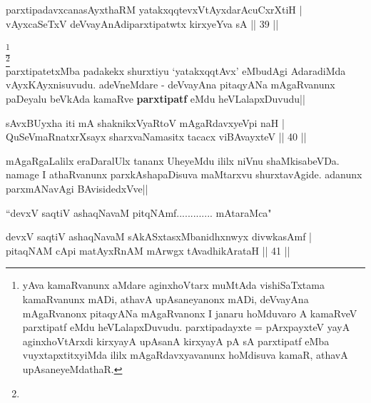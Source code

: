 
\begin{shl}
parxtipadavxcanasAyxthaRM  yatakxqqtevxVtAyxdarAcuCxrXtiH | \\
vAyxcaSeTxV deVvayAnAdiparxtipatwtx kirxyeYva sA \hfill|| 39 || 
\end{shl}

\begin{artha}
\footnote[1]{yAva kamaRvanunx aMdare aginxhoVtarx muMtAda 
vishiSaTxtama kamaRvanunx mADi, athavA upAsaneyanonx mADi, deVvayAna 
mAgaRvanonx pitaqyANa mAgaRvanonx I janaru hoMduvaro A kamaRveV 
parxtipatf eMdu heVLalapxDuvudu. parxtipadayxte = pArxpayxteV yayA 
aginxhoVtArxdi kirxyayA upAsanA kirxyayA pA sA parxtipatf eMba 
vuyxtapxtitxyiMda ililx mAgaRdavxyavanunx hoMdisuva kamaR, athavA 
upAsaneyeMdathaR.}\\
\footnote[2]{}\\
parxtipatetxMba padakekx shurxtiyu `yatakxqqtAvx' eMbudAgi AdaradiMda 
vAyxKAyxnisuvudu. adeVneMdare - deVvayAna pitaqyANa mAgaRvanunx 
paDeyalu beVkAda kamaRve \textbf{parxtipatf} eMdu heVLalapxDuvudu||
\end{artha}


\begin{shl}
sAvxBUyxha iti mA shaknikxVyaRtoV mAgaRdavxyeV\s pi naH | \\
QuSeVmaRnatxrXsayx sharxvaNamasitx tacacx viBAvayxteV \hfill|| 40 || 
\end{shl}

\begin{artha}
mAgaRgaLalilx eraDaralUlx tananx UheyeMdu ililx niVnu shaMkisabeVDa. 
namage I athaRvanunx parxkAshapaDisuva maMtarxvu shurxtavAgide. 
adanunx parxmANavAgi BAvisidedxVve||
\end{artha}


\begin{shl}
``devxV saqtiV ashaqNavaM pitqNAmf............. mAtaraMca"
\end{shl}


\begin{shl}
devxV saqtiV ashaqNavaM sAkASxtasxMbanidhxnwyx divwkasAmf | \\
pitaqNAM cApi matAyxRnAM mArwgx tAvadhikArataH \hfill|| 41 || 
\end{shl}


